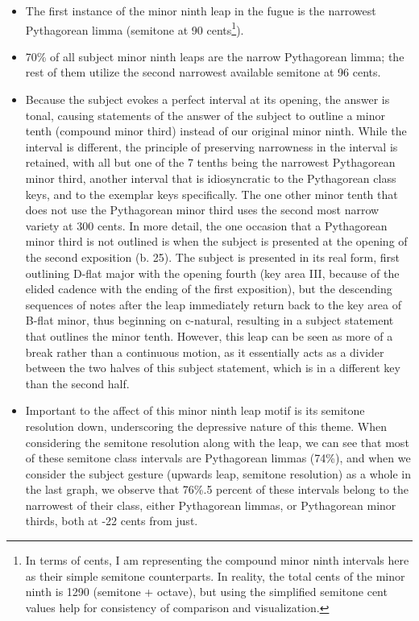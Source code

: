 \begin{itemize}
\tightlist
\item
  The first instance of the minor ninth leap in the fugue is the
  narrowest Pythagorean limma (semitone at 90
  cents\footnote{In terms of cents, I am representing the compound minor ninth intervals here as their simple semitone counterparts. In reality, the total cents of the minor ninth is 1290 (semitone + octave), but using the simplified semitone cent values help for consistency of comparison and visualization.}).
\item
  70\% of all subject minor ninth leaps are the narrow Pythagorean
  limma; the rest of them utilize the second narrowest available
  semitone at 96 cents.
\item
  Because the subject evokes a perfect interval at its opening, the
  answer is tonal, causing statements of the answer of the subject to
  outline a minor tenth (compound minor third) instead of our original
  minor ninth. While the interval is different, the principle of
  preserving narrowness in the interval is retained, with all but one of
  the 7 tenths being the narrowest Pythagorean minor third, another
  interval that is idiosyncratic to the Pythagorean class keys, and to
  the exemplar keys specifically. The one other minor tenth that does
  not use the Pythagorean minor third uses the second most narrow
  variety at 300 cents. In more detail, the one occasion that a
  Pythagorean minor third is not outlined is when the subject is
  presented at the opening of the second exposition (b. 25). The subject
  is presented in its real form, first outlining D-flat major with the
  opening fourth (key area III, because of the elided cadence with the
  ending of the first exposition), but the descending sequences of notes
  after the leap immediately return back to the key area of B-flat
  minor, thus beginning on c-natural, resulting in a subject statement
  that outlines the minor tenth. However, this leap can be seen as more
  of a break rather than a continuous motion, as it essentially acts as
  a divider between the two halves of this subject statement, which is
  in a different key than the second half.
\item
  Important to the affect of this minor ninth leap motif is its semitone
  resolution down, underscoring the depressive nature of this theme.
  When considering the semitone resolution along with the leap, we can
  see that most of these semitone class intervals are Pythagorean limmas
  (74\%), and when we consider the subject gesture (upwards leap,
  semitone resolution) as a whole in the last graph, we observe that
  76\%.5 percent of these intervals belong to the narrowest of their
  class, either Pythagorean limmas, or Pythagorean minor thirds, both at
  -22 cents from just.
\end{itemize}

